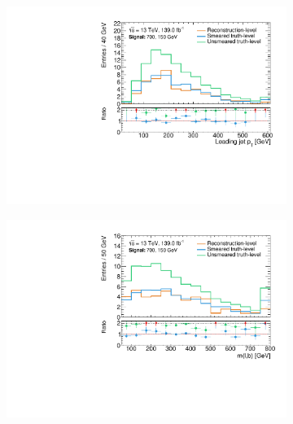 \begin{figure}
\begin{subfigure}[b]{0.47\linewidth}
	\end{subfigure}\hfill
	\begin{subfigure}[b]{0.47\linewidth}
		\centering\includegraphics[width=\textwidth]{20210324/700_150/jet1Pt_C1N2_Wh_hbb_700p0_150p0_smeared.pdf}
	\end{subfigure}\hfill
	\begin{subfigure}[b]{0.47\linewidth}
		\centering\includegraphics[width=\textwidth]{20210324/700_150/mlb1_C1N2_Wh_hbb_700p0_150p0_smeared.pdf}
	\end{subfigure}\hfill
	\begin{subfigure}[b]{0.47\linewidth}

\end{subfigure}
\end{figure}
